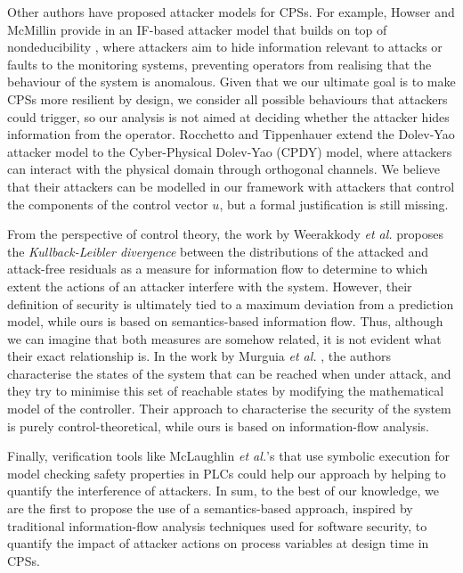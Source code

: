 {{{
Other authors have proposed attacker models for CPSs. For example, Howser and McMillin provide in \cite{StuxnetOnCPS} an IF-based attacker model that builds on top of nondeducibility \cite{Nondeducibility}, where attackers aim to hide information relevant to attacks or faults to the monitoring systems, preventing operators from realising that the behaviour of the system is anomalous. Given that we our ultimate goal is to make CPSs more resilient by design, we consider all possible behaviours that attackers could trigger, so our analysis is not aimed at deciding whether the attacker hides information from the operator. Rocchetto and Tippenhauer \cite{CPSDolevYao} extend the Dolev-Yao attacker model \cite{DolevYao} to the Cyber-Physical Dolev-Yao (CPDY) model, where attackers can interact with the physical domain through orthogonal channels. We believe that their attackers can be modelled in our framework with  attackers that control the components of the control vector $u$, but a formal justification is still missing.
}

From the perspective of control theory, the work by Weerakkody \emph{et al.} \cite{IFCPSSec} proposes the \emph{Kullback-Leibler divergence} between the distributions of the attacked and attack-free residuals as {a measure for information flow} to determine to which extent the actions of an attacker interfere with the system. However, their definition of security is ultimately tied to a maximum deviation from a prediction model, while ours is based on semantics-based information flow. Thus, although we can imagine that both measures are somehow related, it is not evident what their exact relationship is. In the work by Murguia \emph{et al.} \cite{ReachableSets}, the authors characterise the states of the system that can be reached when under attack, and they try to minimise this set of reachable states by modifying the mathematical model of the controller. Their approach to characterise the security of the system is purely control-theoretical, while ours is based on information-flow analysis.

Finally, verification tools like McLaughlin \emph{et al.}'s \cite{TSVPLC} that use symbolic execution for model checking safety properties in PLCs could help our approach by helping to quantify the interference of attackers.
{
In sum, to the best of our knowledge, we are the first to propose the use of a semantics-based approach, inspired by traditional information-flow analysis techniques used for software security, to quantify the impact of attacker actions on process variables at design time in CPSs.
}
}
}
